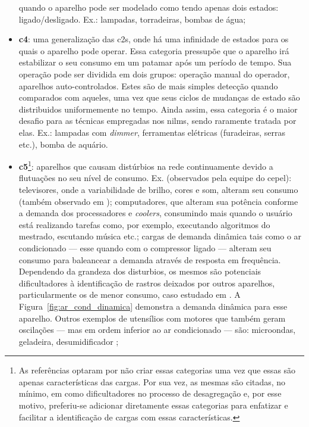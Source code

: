\begin{itemize}
quando o aparelho pode ser modelado como tendo apenas dois estados:
ligado/desligado. Ex.: lampadas, torradeiras, bombas de água;
\item \textbf{\Gls{c4}}: uma generalização das \glspl{c2}, onde
há uma infinidade de estados para os quais o aparelho pode operar.
Essa categoria pressupõe que o aparelho irá estabilizar o seu consumo
em um patamar após um período de tempo. Sua operação pode ser dividida
em dois grupos: operação manual do operador, aparelhos
auto-controlados. Estes são de mais simples detecção quando comparados
com aqueles, uma vez que seus ciclos de mudanças de estado são
distribuidos uniformemente no tempo. Ainda assim, essa categoria é o
maior desafio para as técnicas empregadas nos \glspl{nilm}, sendo
raramente tratada por elas. Ex.: lampadas com \emph{dimmer},
ferramentas elétricas (furadeiras, serras etc.), bomba de aquário.
\item \textbf{\Gls{c5}}\footnote{As referências optaram por não
criar essas categorias uma vez que essas são apenas
características das cargas. Por sua vez, as mesmas são citadas, no
mínimo, em \cite{nilm_zeifman_review_2011,nilm_liang_pt2_2010_40}
como dificultadores no processo de desagregação e, por esse motivo,
preferiu-se adicionar diretamente essas categorias para
enfatizar e facilitar a identificação de cargas com essas
características.\label{fn:categoria_add}}: aparelhos que causam
distúrbios na rede continuamente devido a flutuações no seu nível de
consumo. Ex. (observados pela equipe do \gls{cepel}): televisores,
onde a variabilidade de brilho, cores e som, alteram seu consumo
(também observado em 
\cite{nilm_zeifman_statistical_approach_resumo_2013});
computadores, que alteram sua potência conforme a demanda dos
processadores e \emph{coolers}, consumindo mais quando o usuário está
realizando tarefas como, por exemplo, executando algoritmos do
mestrado, escutando música etc.; cargas de demanda dinâmica tais como
o ar condicionado --- esse quando com o compressor ligado --- alteram
seu consumo para baleancear a demanda através de resposta em
frequência.  Dependendo da grandeza dos disturbios, os mesmos são
potenciais dificultadores à identificação de rastros deixados por
outros aparelhos, particularmente os de menor consumo, caso estudado 
em \cite{nilm_liang_pt2_2010_40}. A Figura~\ref{fig:ar_cond_dinamica}
demonstra a demanda dinâmica para esse aparelho. Outros exemplos de
utensílios com motores que também geram oscilações --- mas em ordem
inferior ao ar condicionado --- são: microondas, geladeira,
desumidificador \cite{nilm_liang_pt2_2010_40};

\end{itemize}
